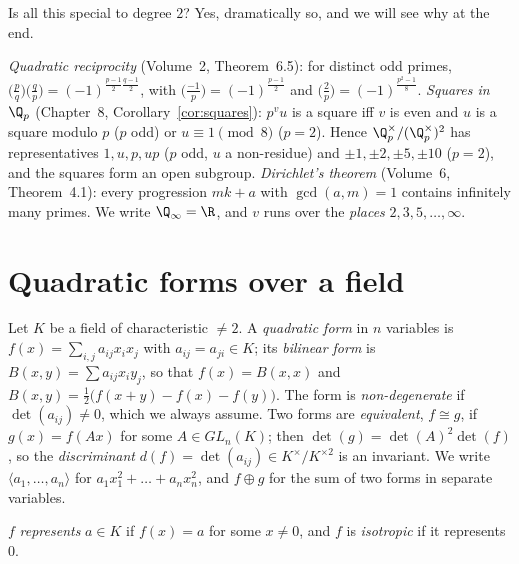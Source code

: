Is all this special to degree $2$? Yes, dramatically so, and we will see why at the end.

\begin{reminder}
\emph{Quadratic reciprocity} (Volume~2, Theorem~6.5): for distinct odd primes, $\bigl(\frac pq\bigr)\bigl(\frac qp\bigr)=
(-1)^{\frac{p-1}2\frac{q-1}2}$, with $\bigl(\frac{-1}p\bigr)=(-1)^{\frac{p-1}2}$ and $\bigl(\frac2p\bigr)=(-1)^{\frac{p^2-1}8}$.
\emph{Squares in $\Q_p$} (Chapter~8, Corollary~\ref{cor:squares}): $p^vu$ is a square iff $v$ is even and $u$ is a square modulo $p$ ($p$ odd)
or $u\equiv1\pmod8$ ($p=2$). Hence $\Q_p^\times/(\Q_p^\times)^2$ has representatives $1,u,p,up$ ($p$ odd, $u$ a non-residue) and
$\pm1,\pm2,\pm5,\pm10$ ($p=2$), and the squares form an open subgroup. \emph{Dirichlet's theorem} (Volume~6, Theorem~4.1): every
progression $mk+a$ with $\gcd(a,m)=1$ contains infinitely many primes. We write $\Q_\infty=\R$, and $v$ runs over the
\emph{places} $2,3,5,\dots,\infty$.
\end{reminder}

\section{Quadratic forms over a field}

Let $K$ be a field of characteristic $\ne2$. A \emph{quadratic form} in $n$ variables is $f(x)=\sum_{i,j}a_{ij}x_ix_j$ with
$a_{ij}=a_{ji}\in K$; its \emph{bilinear form} is $B(x,y)=\sum a_{ij}x_iy_j$, so that $f(x)=B(x,x)$ and $B(x,y)=\frac12\bigl(f(x+y)
-f(x)-f(y)\bigr)$. The form is \emph{non-degenerate} if $\det(a_{ij})\ne0$, which we always assume. Two forms are
\emph{equivalent}, $f\cong g$, if $g(x)=f(Ax)$ for some $A\in GL_n(K)$; then $\det(g)=\det(A)^2\det(f)$, so the
\emph{discriminant} $d(f)=\det(a_{ij})\in K^\times/K^{\times2}$ is an invariant. We write $\langle a_1,\dots,a_n\rangle$ for
$a_1x_1^2+\dots+a_nx_n^2$, and $f\oplus g$ for the sum of two forms in separate variables.

$f$ \emph{represents} $a\in K$ if $f(x)=a$ for some $x\ne0$, and $f$ is \emph{isotropic} if it represents $0$.

